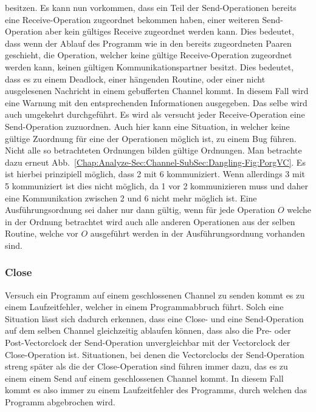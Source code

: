 besitzen. Es kann nun vorkommen, dass ein Teil der Send-Operationen bereits eine 
Receive-Operation zugeordnet bekommen haben, einer weiteren Send-Operation 
aber kein gültiges Receive zugeordnet werden kann. Dies bedeutet, dass 
wenn der Ablauf des Programm wie in den bereits zugeordneten Paaren geschieht, die Operation, 
welcher keine gültige Receive-Operation zugeordnet werden kann, keinen 
gültigen Kommunikationspartner besitzt. Dies bedeutet, dass es zu einem 
Deadlock, einer hängenden Routine, oder einer nicht ausgelesenen Nachricht 
in einem gebufferten Channel kommt. In diesem Fall wird eine Warnung 
mit den entsprechenden Informationen ausgegeben. Das selbe wird auch umgekehrt durchgeführt. Es wird als 
versucht jeder Receive-Operation eine Send-Operation zuzuordnen. 
Auch hier kann eine Situation, in welcher keine gültige Zuordnung für eine
der Operationen möglich ist, zu einem Bug führen.\\
Nicht alle so betrachteten Ordnungen bilden gültige Ordnungen. Man betrachte 
dazu erneut Abb.~\ref{Chap:Analyze-Sec:Channel-SubSec:Dangling-Fig:PorgVC}. 
Es ist hierbei prinzipiell möglich, dass 2 mit 6 kommuniziert. Wenn 
allerdings 3 mit 5 kommuniziert ist dies nicht möglich, da 1 vor 2 kommunizieren 
muss und daher eine Kommunikation zwischen 2 und 6 nicht mehr möglich ist. 
Eine Ausführungsordnung sei daher nur dann gültig, wenn für jede Operation $O$ 
welche in der Ordnung betrachtet wird auch alle anderen Operationen aus 
der selben Routine, welche vor $O$ ausgeführt werden in der Ausführungsordnung 
vorhanden sind.



\subsubsection{Close}
Versuch ein Programm auf einem geschlossenen Channel zu senden kommt es zu einem Laufzeitfehler, 
welcher in einem Programmabbruch führt. Solch eine Situation lässt sich 
dadurch erkennen, dass eine Close- und eine Send-Operation auf dem selben Channel
gleichzeitig ablaufen können, dass also die Pre- oder Post-Vectorclock 
der Send-Operation unvergleichbar mit der Vectorclock der Close-Operation 
ist. Situationen, bei denen die Vectorclocks der Send-Operation streng später 
als die der Close-Operation sind führen immer dazu, das es zu einem einem 
Send auf einem geschlossenen Channel kommt. In diesem Fall kommt es also immer 
zu einem Laufzeitfehler des Programms, durch welchen das Programm abgebrochen wird.


